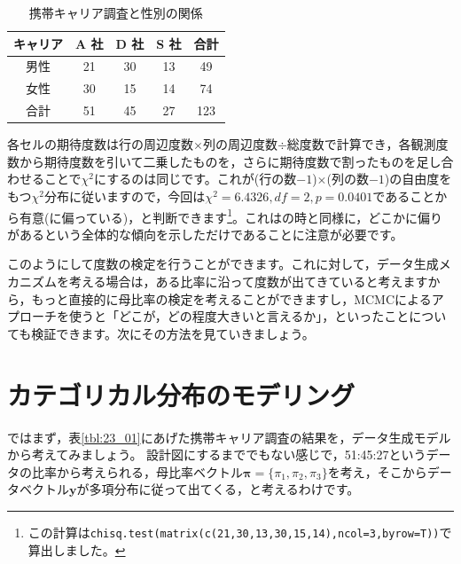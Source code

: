 \documentclass{ltjsbook}
\begin{document}
\begin{table}[ht]
	\centering
	\caption{携帯キャリア調査と性別の関係}
	\begin{tabular}{c|ccc|c}
		キャリア & A 社 & D 社 & S 社 & 合計  \\\hline
		男性   & 21  & 30  & 13  & 49  \\
		女性   & 30  & 15  & 14  & 74  \\\hline
		合計   & 51  & 45  & 27  & 123 \\
	\end{tabular}
	\label{tbl:23_02}
\end{table}

各セルの期待度数は行の周辺度数$\times$列の周辺度数$\div$総度数で計算でき，各観測度数から期待度数を引いて二乗したものを，さらに期待度数で割ったものを足し合わせることで$\chi^2$にするのは同じです。これが(行の数$-1$)$\times$(列の数$-1$)の自由度をもつ$\chi^2$分布に従いますので，今回は$\chi^2=6.4326,df=2,p=0.0401$であることから有意(に偏っている)，と判断できます\footnote{この計算は\verb|chisq.test(matrix(c(21,30,13,30,15,14),ncol=3,byrow=T))|で算出しました。}。これはの時と同様に，どこかに偏りがあるという全体的な傾向を示しただけであることに注意が必要です。

このようにして度数の検定を行うことができます。これに対して，データ生成メカニズムを考える場合は，ある比率に沿って度数が出てきていると考えますから，もっと直接的に母比率の検定を考えることができますし，MCMCによるアプローチを使うと「どこが，どの程度大きいと言えるか」，といったことについても検証できます。次にその方法を見ていきましょう。

\section{カテゴリカル分布のモデリング}
ではまず，表\ref{tbl:23_01}にあげた携帯キャリア調査の結果を，データ生成モデルから考えてみましょう。
設計図にするまででもない感じで，51:45:27というデータの比率から考えられる，母比率ベクトル$\bm{\pi} = \{ \pi_1,\pi_2,\pi_3 \}$を考え，そこからデータベクトル$\bm{y}$が多項分布に従って出てくる，と考えるわけです。
\end{document}
